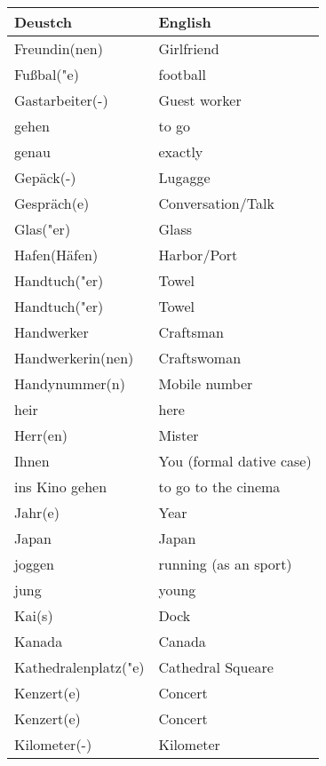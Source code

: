 \documentclass{article}
\renewcommand{\arraystretch}{1}
\begin{document}
\hfill
\begin{minipage}{0.48\textwidth}
    \centering
    \renewcommand{\arraystretch}{1.5}
    \begin{tabular}{|>{\raggedright\arraybackslash}p{3.5cm}|>{\raggedright\arraybackslash}p{3.5cm}|}
        \hline
        \rowcolor{gray!20} \textbf{Deustch} & \textbf{English} \\
        \hline
        Freundin(nen) & Girlfriend \\\hline
        Fu\ss{}bal("e) & football \\\hline
        Gastarbeiter(-) & Guest worker \\\hline
        gehen & to go \\\hline
        genau & exactly \\\hline
        Gepäck(-) & Lugagge \\\hline
        Gespräch(e) & Conversation/Talk \\\hline
        Glas("er) & Glass \\\hline
        Hafen(Häfen) & Harbor/Port \\\hline
        Handtuch("er) & Towel \\\hline
        Handtuch("er) & Towel \\\hline
        Handwerker & Craftsman \\\hline
        Handwerkerin(nen) & Craftswoman \\\hline
        Handynummer(n) & Mobile number \\\hline
        heir & here \\\hline
        Herr(en) & Mister \\\hline
        Ihnen & You (formal dative case) \\\hline
        ins Kino gehen & to go to the cinema \\\hline
        Jahr(e) & Year \\\hline
        Japan & Japan \\\hline
        joggen & running (as an sport) \\\hline
        jung & young \\\hline
        Kai(s) & Dock \\\hline
        Kanada & Canada \\\hline
        Kathedralenplatz("e) & Cathedral Squeare \\\hline
        Kenzert(e) & Concert \\\hline
        Kenzert(e) & Concert \\\hline
        Kilometer(-) & Kilometer \\\hline

\end{tabular}
\end{minipage}
\end{document}
